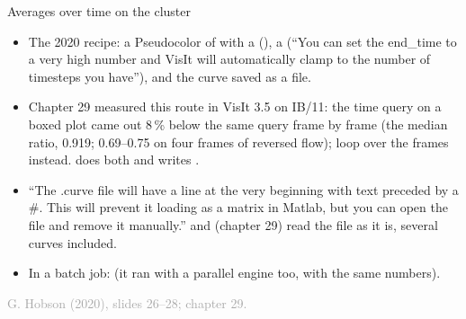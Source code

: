 \documentclass[aspectratio=169,11pt]{beamer}
\newcommand{\sourcecredit}[1]{\vfill\begin{flushright}\tiny\textcolor{DarkGray}{#1}\end{flushright}}
\begin{document}
\begin{frame}{Averages over time on the cluster}
\label{fr:average}
\footnotesize
\begin{itemize}\setlength{\itemsep}{1pt}
  \item The 2020 recipe: a Pseudocolor of  with a  (), a  (``You can set the end\_time to a very high number and VisIt will automatically clamp to the number of timesteps you have''), and the curve saved as a  file.
  \item Chapter 29 measured this route in VisIt 3.5 on IB/11: the time query on a boxed plot came out 8\,\% below the same query frame by frame (the median ratio, 0.919; 0.69--0.75 on four frames of reversed flow); loop over the frames instead.  does both and writes .
  \item ``The .curve file will have a line at the very beginning with text preceded by a \#. This will prevent it loading as a matrix in Matlab, but you can open the file and remove it manually.''  and  (chapter 29) read the file as it is, several curves included.
  \item In a batch job:  (it ran with a parallel engine too, with the same numbers).
\end{itemize}
\sourcecredit{G. Hobson (2020), slides 26--28; chapter 29.}
\end{frame}
\end{document}
